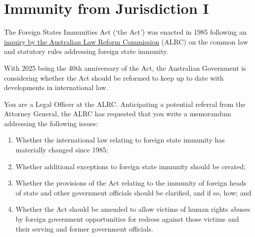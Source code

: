 \section{Immunity from Jurisdiction I}
\begin{tutorialquestion}
    \flushleft
    The Foreign States Immunities Act (`the Act') was enacted in 1985 following an \href{http://www.austlii.edu.au/au/other/lawreform/ALRC/1984/24.html}{inquiry by the Australian Law Reform Commission} (ALRC) on the common law and statutory rules addressing foreign state immunity.

    \vspace{\baselineskip}
    
    With 2025 being the 40th anniversary of the Act, the Australian Government is considering 
    whether the Act should be reformed to keep up to date with developments in international law.
    
    \vspace{\baselineskip}
    
    You are a Legal Officer at the ALRC. Anticipating a potential referral from the Attorney General, the ALRC has requested that you write a memorandum addressing the following issues:

    \begin{enumerate}
        \item Whether the international law relating to foreign state immunity has materially changed since 1985;
        \item Whether additional exceptions to foreign state immunity should be created;
        \item Whether the provisions of the Act relating to the immunity of foreign heads of state and other government officials should be clarified, and if so, how; and
        \item Whether the Act should be amended to allow victims of human rights abuses by foreign government opportunities for redress against those victims and their serving and former government officials.
    \end{enumerate}
\end{tutorialquestion}

